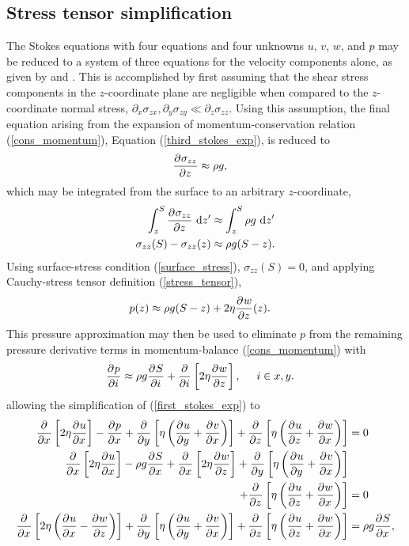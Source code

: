 \subsection{Stress tensor simplification}

The Stokes equations with four equations and four unknowns $u$, $v$, $w$, and $p$ may be reduced to a system of three equations for the velocity components alone, as given by \citet{blatter_1995} and \citet{pattyn_2003}.  This is accomplished by first assuming that the shear stress components in the $z$-coordinate plane are negligible when compared to the $z$-coordinate normal stress, \ie $\partial_x \sigma_{zx}, \partial_y \sigma_{zy} \ll \partial_z \sigma_{zz}$.  Using this assumption, the final equation arising from the expansion of momentum-conservation relation (\ref{cons_momentum}), Equation (\ref{third_stokes_exp}), is reduced to
\begin{align}
  \label{stress_tensor_simplification}
  \frac{\partial^{} \sigma_{zz}}{\partial z^{} } &\approx \rho g,
\end{align}
which may be integrated from the surface to an arbitrary $z$-coordinate,
\begin{align*}
  \int_z^S \frac{\partial^{} \sigma_{zz}}{\partial z^{} } \ \mathrm{d}z' &\approx \int_z^S \rho g \ \mathrm{d}z' \\
  \sigma_{zz}(S) - \sigma_{zz}(z) &\approx \rho g (S - z).
\end{align*}
Using surface-stress condition (\ref{surface_stress}), $\sigma_{zz}(S) = 0$, and applying Cauchy-stress tensor definition (\ref{stress_tensor}),
\begin{align}
  \label{bp_pressure}
  p(z) &\approx \rho g(S - z) + 2\eta \frac{\partial^{} w}{\partial z^{} }(z).
\end{align}
This pressure approximation may then be used to eliminate $p$ from the remaining pressure derivative terms in momentum-balance (\ref{cons_momentum}) with
\begin{align}
  \label{bp_pressure_gradient}
  \frac{\partial^{} p}{\partial i^{} } &\approx
  \rho g\frac{\partial^{} S}{\partial i^{} } + \frac{\partial^{} }{\partial i^{} } \left[ 2\eta \frac{\partial^{} w}{\partial z^{} } \right], \hspace{5mm} i \in x,y.
\end{align}
allowing the simplification of (\ref{first_stokes_exp}) to
{\tiny
\begin{align}
  \frac{\partial^{} }{\partial x^{} } \left[2\eta \frac{\partial^{} u}{\partial x^{} } \right]  - \frac{\partial^{} p}{\partial x^{} } + \frac{\partial^{} }{\partial y^{} } \left[\eta \left( \frac{\partial^{} u}{\partial y^{} } + \frac{\partial^{} v}{\partial x^{} } \right) \right] + \frac{\partial^{} }{\partial z^{} } \left[\eta \left( \frac{\partial^{} u}{\partial z^{} } + \frac{\partial^{} w}{\partial x^{} } \right) \right] &= 0 \notag \\ 
  \frac{\partial^{} }{\partial x^{} } \left[2\eta \frac{\partial^{} u}{\partial x^{} } \right]  - \rho g\frac{\partial^{} S}{\partial x^{} } + \frac{\partial^{} }{\partial x^{} } \left[ 2\eta \frac{\partial^{} w}{\partial z^{} } \right] + \frac{\partial^{} }{\partial y^{} } \left[\eta \left( \frac{\partial^{} u}{\partial y^{} } + \frac{\partial^{} v}{\partial x^{} } \right) \right] & \notag \\
  + \frac{\partial^{} }{\partial z^{} } \left[\eta \left( \frac{\partial^{} u}{\partial z^{} } + \frac{\partial^{} w}{\partial x^{} } \right) \right] &= 0 \notag \\ 
  \label{first_stokes_exp_stress_simp}
  \frac{\partial^{} }{\partial x^{} } \left[2\eta \left( \frac{\partial^{} u}{\partial x^{} } - \frac{\partial^{} w}{\partial z^{} } \right) \right]  + \frac{\partial^{} }{\partial y^{} } \left[\eta \left( \frac{\partial^{} u}{\partial y^{} } + \frac{\partial^{} v}{\partial x^{} } \right) \right] + \frac{\partial^{} }{\partial z^{} } \left[\eta \left( \frac{\partial^{} u}{\partial z^{} } + \frac{\partial^{} w}{\partial x^{} } \right) \right] &= \rho g\frac{\partial^{} S}{\partial x^{} },
\end{align}}
